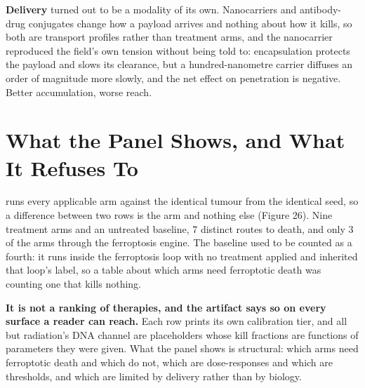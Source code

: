 \documentclass[11pt,twoside,openright]{report}
\begin{document}
\textbf{Delivery} turned out to be a modality of its own. Nanocarriers and antibody-drug conjugates change how a payload arrives and nothing about how it kills, so both are transport profiles rather than treatment arms, and the nanocarrier reproduced the field's own tension without being told to: encapsulation protects the payload and slows its clearance, but a hundred-nanometre carrier diffuses an order of magnitude more slowly, and the net effect on penetration is negative. Better accumulation, worse reach.

\section{What the Panel Shows, and What It Refuses To}

 runs every applicable arm against the identical tumour from the identical seed, so a difference between two rows is the arm and nothing else (Figure 26). Nine treatment arms and an untreated baseline, 7 distinct routes to death, and only 3 of the arms through the ferroptosis engine. The baseline used to be counted as a fourth: it runs inside the ferroptosis loop with no treatment applied and inherited that loop's label, so a table about which arms need ferroptotic death was counting one that kills nothing.

\textbf{It is not a ranking of therapies, and the artifact says so on every surface a reader can reach.} Each row prints its own calibration tier, and all but radiation's DNA channel are placeholders whose kill fractions are functions of parameters they were given. What the panel shows is structural: which arms need ferroptotic death and which do not, which are dose-responses and which are thresholds, and which are limited by delivery rather than by biology.
\end{document}
